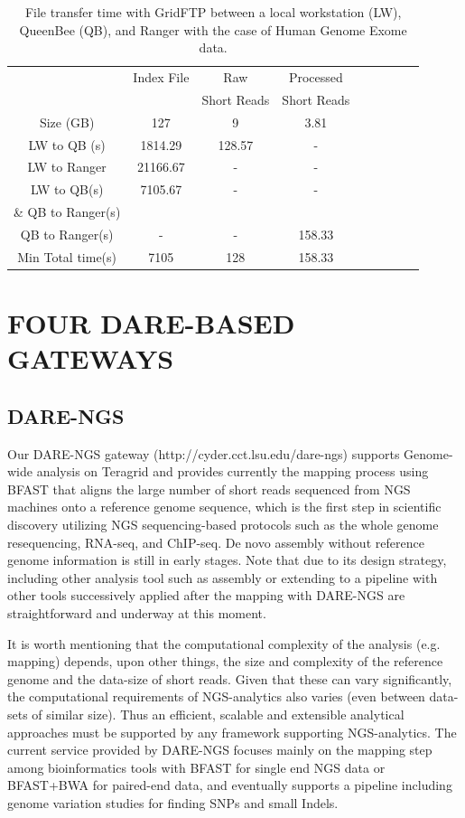 \documentclass{sig-alternate}
\begin{document}
 \begin{table}
 \small
 \begin{tabular}{|c|c|c|c|c|c|c|c|c|} 
 \hline 
	                      &  Index File	&Raw &	Processed\\
	                      &&Short Reads& Short Reads\\
\hline 
Size  (GB)    	             &127&	9	&3.81\\
 \hline                       
LW to QB (s)   & 1814.29&	128.57&  -\\
  \hline
LW to Ranger & 21166.67 & - & -\\
   \hline
LW to QB(s)    & 7105.67& - &-\\
 \& QB to Ranger(s)     &&&\\
 \hline
QB to Ranger(s)   	&-&-& 158.33\\
\hline
Min Total time(s)    &	7105 &	128&	158.33\\
 \hline
\end{tabular}
\caption{File transfer time with GridFTP between a local workstation (LW), QueenBee (QB), and Ranger with the case of Human Genome Exome data.  }

 \label{table:NGS-Distributed-file} 
\end{table}


\section{FOUR DARE-BASED GATEWAYS}
\subsection{DARE-NGS}
Our DARE-NGS gateway (http://cyder.cct.lsu.edu/dare-ngs) supports Genome-wide analysis on Teragrid and provides currently the mapping process using BFAST that aligns the large number of short reads sequenced from NGS machines onto a reference genome sequence, which is the first step in scientific discovery utilizing NGS sequencing-based protocols such as the whole genome resequencing, RNA-seq, and ChIP-seq.  De novo assembly without reference genome information is still in early stages.  Note that due to its design strategy, including other analysis tool such as assembly or extending to a pipeline with other tools successively applied after the mapping with DARE-NGS are straightforward and underway at this moment.

It is worth mentioning that the computational complexity
of the analysis (e.g. mapping) depends, upon other things, the size
and complexity of the reference genome and the data-size of short reads.
Given that these can vary significantly, the computational
requirements of NGS-analytics also varies (even between data-sets of
similar size).  Thus an efficient, scalable and extensible analytical
approaches must be supported by any framework supporting
NGS-analytics.  The current service provided by DARE-NGS focuses mainly on the mapping step among bioinformatics tools with BFAST for single end NGS data or BFAST+BWA for paired-end data, and eventually supports a pipeline including genome variation studies for finding SNPs and small Indels.
\end{document}
